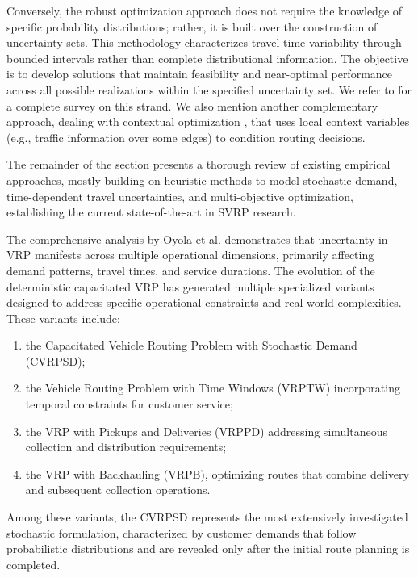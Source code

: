 \documentclass[preprint,12pt]{elsarticle}
\begin{document}
Conversely, the robust optimization approach does not require the knowledge of specific probability distributions; rather, it is built over the construction of uncertainty sets. This methodology characterizes travel time variability through bounded intervals rather than complete distributional information. The objective is to develop solutions that maintain feasibility and near-optimal performance across all possible realizations within the specified uncertainty set.
We refer to \cite{delage2010distributionally} for a complete survey on this strand. We also mention another complementary approach, dealing with
contextual optimization \cite{CSO}, that uses local context variables (e.g., traffic information over some edges) to condition routing decisions. 




The remainder of the section presents a thorough review of existing empirical approaches, mostly building on heuristic methods to model stochastic demand, time-dependent travel uncertainties, and multi-objective optimization, establishing the current state-of-the-art in SVRP research.  




The comprehensive analysis by Oyola et al. \cite{Oyola1, Oyola2} demonstrates that uncertainty in VRP manifests across multiple operational dimensions, primarily affecting demand patterns, travel times, and service durations. The evolution of the deterministic capacitated VRP has generated multiple specialized variants designed to address specific operational constraints and real-world complexities. These variants include: 
\begin{enumerate}


\item the Capacitated Vehicle Routing Problem with Stochastic Demand (CVRPSD);

\item the Vehicle Routing Problem with Time Windows (VRPTW) incorporating temporal constraints for customer service;

\item the VRP with Pickups and Deliveries (VRPPD) addressing simultaneous collection and distribution requirements;

\item the VRP with Backhauling (VRPB), optimizing routes that combine delivery and subsequent collection operations. 
\end{enumerate}
Among these variants, the CVRPSD represents the most extensively investigated stochastic formulation, characterized by customer demands that follow probabilistic distributions and are revealed only after the initial route planning is completed.
\end{document}
